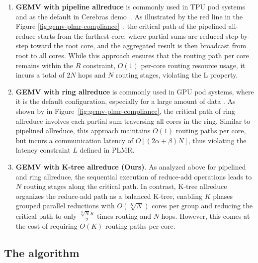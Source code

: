 \begin{enumerate}[label=(\arabic*), leftmargin=0.5cm, noitemsep,topsep=0pt]

 \item \textbf{GEMV with pipeline allreduce} is commonly used in TPU pod systems~\cite{google2023efficiently} and as the default in Cerebras demo~\cite{cerebrasgemv}. As illustrated by the red line in the Figure \ref{fig:gemv-plmr-compliance}~, the critical path of the pipelined all-reduce starts from the farthest core, where partial sums are reduced step-by-step toward the root core, and the aggregated result is then broadcast from root to all cores. While this approach ensures that the routing path per core remains within the $R$ constraint, $O(1)$ per-core routing resource usage, it incurs a total of $2N$ hops and $N$ routing stages, violating the L property.

\item \textbf{GEMV with ring allreduce} is commonly used in GPU pod systems, where it is the default configuration, especially for a large amount of data \cite{wafer-reduce}. As shown by  in Figure~\ref{fig:gemv-plmr-compliance}, the critical path of ring allreduce involves each partial sum traversing all cores in the ring. Similar to pipelined allreduce, this approach maintains $O(1)$ routing paths per core, but incurs a communication latency of $O\left[(2\alpha + \beta)N\right]$, thus violating the latency constraint $L$ defined in PLMR.

\item \textbf{GEMV with K-tree allreduce (Ours)}. As analyzed above for pipelined and ring allreduce, the sequential execution of reduce-add operations leads to $N$ routing stages along the critical path. In contrast, K-tree allreduce organizes the reduce-add path as a balanced K-tree, enabling $K$ phases grouped parallel reductions with $O(\sqrt[K]{N})$ cores per group and reducing the critical path to only $\frac{\sqrt[K]{N}K}{2}$ times routing and $N$ hops. However, this comes at the cost of requiring $O(K)$ routing paths per core.

\end{enumerate}

\vspace{-3mm}
\subsection{The \gemv algorithm}
\vspace{-1mm}


